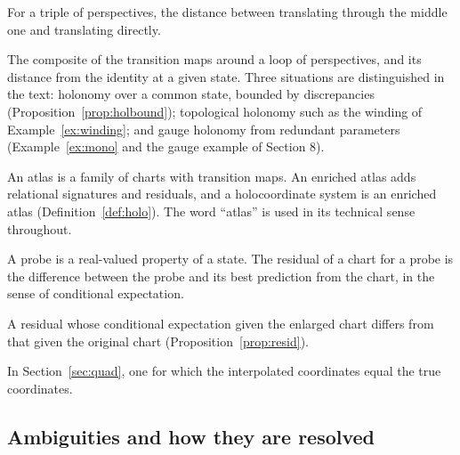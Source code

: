 \documentclass[11pt]{article}
\theoremstyle{remark}
\begin{document}
\begin{description}[leftmargin=1.2em,style=nextline,itemsep=3pt]
\item[Cocycle defect.] For a triple of perspectives, the distance between translating through the middle one and translating directly.
\item[Holonomy map and discrepancy.] The composite of the transition maps around a loop of perspectives, and its distance from the identity at a given state. Three situations are distinguished in the text: holonomy over a common state, bounded by discrepancies (Proposition~\ref{prop:holbound}); topological holonomy such as the winding of Example~\ref{ex:winding}; and gauge holonomy from redundant parameters (Example~\ref{ex:mono} and the gauge example of Section 8).
\item[Atlas, enriched atlas, holocoordinate system.] An atlas is a family of charts with transition maps. An enriched atlas adds relational signatures and residuals, and a holocoordinate system is an enriched atlas (Definition~\ref{def:holo}). The word ``atlas'' is used in its technical sense throughout.
\item[Probe, residual.] A probe is a real-valued property of a state. The residual of a chart for a probe is the difference between the probe and its best prediction from the chart, in the sense of conditional expectation.
\item[Structured residual.] A residual whose conditional expectation given the enlarged chart differs from that given the original chart (Proposition~\ref{prop:resid}).
\item[Exact construction.] In Section~\ref{sec:quad}, one for which the interpolated coordinates equal the true coordinates.
\end{description}

\subsection{Ambiguities and how they are resolved}
\end{document}
